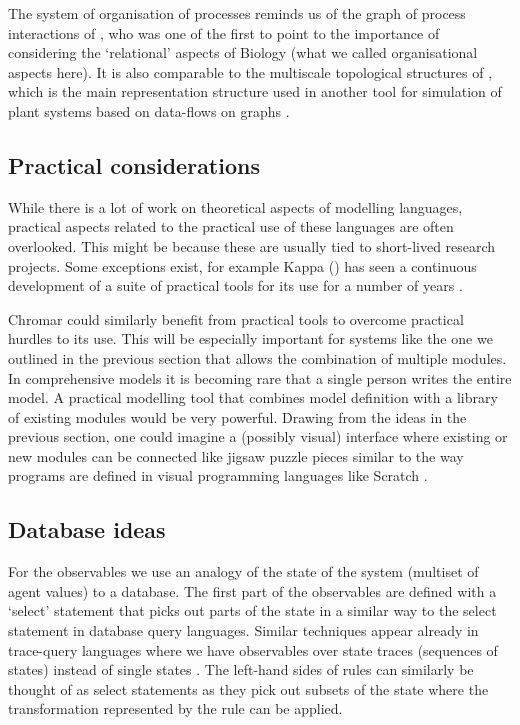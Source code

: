 The system of organisation of processes reminds us of the graph of process
interactions of \citet{rashevsky_topology_1954}, who was one of the first to
point to the importance of considering the `relational' aspects of Biology (what
we called organisational aspects here). It is also comparable to the multiscale
topological structures of \citet{godin_multiscale_1998}, which is the main
representation structure used in another tool for simulation of plant systems
based on data-flows on graphs \citep[OpenAlea;][]{pradal_openalea:_2008}.


\subsection{Practical considerations}
While there is a lot of work on theoretical aspects of modelling languages,
practical aspects related to the practical use of these languages are often
overlooked. This might be because these are usually tied to short-lived research
projects. Some exceptions exist, for example Kappa () has seen
a continuous development of a suite of practical tools for its use for a number
of years \citep[Kappa platform;][]{boutillier2018kappa}.

Chromar could similarly benefit from practical tools to overcome practical
hurdles to its use. This will be especially important for systems like the one
we outlined in the previous section that allows the combination of multiple
modules. In comprehensive models it is becoming rare that a single person writes
the entire model. A practical modelling tool that combines model definition with
a library of existing modules would be very powerful. Drawing from the ideas in
the previous section, one could imagine a (possibly visual) interface where
existing or new modules can be connected like jigsaw puzzle pieces similar to
the way programs are defined in visual programming languages like Scratch
\citep{maloney_scratch_2010}.

\subsection{Database ideas}
For the observables we use an analogy of the state of the system (multiset of
agent values) to a database. The first part of the observables are defined with
a `select' statement that picks out parts of the state in a similar way to the
select statement in database query languages. Similar techniques appear already
in trace-query languages where we have observables over state traces (sequences
of states) instead of single states \citep{laurent_trace_2018}. The left-hand
sides of rules can similarly be thought of as select statements as they pick out
subsets of the state where the transformation represented by the rule can be
applied.

